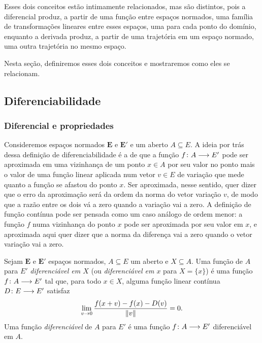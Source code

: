 Esses dois conceitos estão intimamente relacionados, mas são distintos, pois a diferencial produz, a partir de uma função entre espaços normados, uma família de transformações lineares entre esses espaços, uma para cada ponto do domínio, enquanto a derivada produz, a partir de uma trajetória em um espaço normado, uma outra trajetória no mesmo espaço.

Nesta seção, definiremos esses dois conceitos e mostraremos como eles se relacionam.

\subsection{Diferenciabilidade}

\subsubsection{Diferencial e propriedades}

Consideremos espaços normados $\bm E$ e $\bm E'$ e um aberto $A \subseteq E$. A ideia por trás dessa definição de diferenciabilidade é a de que a função $f\colon \allowbreak A \longrightarrow E'$ pode ser aproximada em uma vizinhança de um ponto $x \in A$ por seu valor no ponto mais o valor de uma função linear aplicada num vetor $v \in E$ de variação que mede quanto a função se afastou do ponto $x$. Ser aproximada, nesse sentido, quer dizer que o erro da aproximação será da ordem da norma do vetor variação $v$, de modo que a razão entre os dois vá a zero quando a variação vai a zero. A definição de função contínua pode ser pensada como um caso análogo de ordem menor: a função $f$ numa vizinhança do ponto $x$ pode ser aproximada por seu valor em $x$, e aproximada aqui quer dizer que a norma da diferença vai a zero quando o vetor variação vai a zero.%

\begin{definition}[Diferenciabilidade]
Sejam $\bm E$ e $\bm E'$ espaços normados, $A \subseteq E$ um aberto e $X \subseteq A$. Uma função de $A$ para $E'$ \emph{diferenciável em $X$} (ou \emph{diferenciável em $x$} para $X=\{x\}$) é uma função $f\colon \allowbreak A \longrightarrow E'$ tal que, para todo $x \in X$, alguma função linear contínua $D\colon \allowbreak E \longrightarrow E'$ satisfaz
	\begin{equation}
	\label{eq:condicao.diferenciabilidade}
	\lim_{v \to 0} \frac{f(x+v) - f(x) - D(v)}{\left\Vert{v}\right\Vert} = 0.
	\end{equation}
Uma função \emph{diferenciável} de $A$ para $E'$ é uma função $f\colon \allowbreak A \longrightarrow E'$ diferenciável em $A$.
\end{definition}

